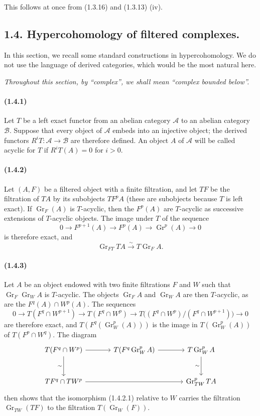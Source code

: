\documentclass[10pt]{article}
\newcommand{\Gr}{\operatorname{Gr}}
\newcommand{\calA}{\mathcal A}
\newcommand{\calB}{\mathcal B}
\newcommand{\iso}{\xrightarrow{\sim}}
\begin{document}
This follows at once from (1.3.16) and (1.3.13) (iv).

\subsection*{1.4. Hypercohomology of filtered complexes.}

In this section, we recall some standard constructions in hypercohomology. We do not use the language of derived categories, which would be the most natural here.

\emph{Throughout this section, by “complex”, we shall mean “complex bounded below”.}

\paragraph{(1.4.1)} Let $T$ be a left exact functor from an abelian category $\calA$ to an abelian category $\calB$. Suppose that every object of $\calA$ embeds into an injective object; the derived functors $R^iT:\calA\to\calB$ are therefore defined. An object $A$ of $\calA$ will be called acyclic for $T$ if $R^iT(A)=0$ for $i>0$.

\paragraph{(1.4.2)} Let $(A,F)$ be a filtered object with a finite filtration, and let $TF$ be the filtration of $TA$ by its subobjects $TF^pA$ (these are subobjects because $T$ is left exact). If $\Gr_F(A)$ is $T$-acyclic, then the $F^p(A)$ are $T$-acyclic as successive extensions of $T$-acyclic objects. The image under $T$ of the sequence
\[
0\to F^{p+1}(A)\to F^p(A)\to\Gr^p(A)\to0
\]
is therefore exact, and
\[
\tag{1.4.2.1}
\Gr_{FT}TA\iso T\Gr_FA.
\]

\paragraph{(1.4.3)} Let $A$ be an object endowed with two finite filtrations $F$ and $W$ such that $\Gr_F\Gr_WA$ is $T$-acyclic. The objects $\Gr_FA$ and $\Gr_WA$ are then $T$-acyclic, as are the $F^q(A)\cap W^p(A)$. The sequences
\[
0\to T(F^q\cap W^{p+1})\to T(F^q\cap W^p)\to T\bigl((F^q\cap W^p)/(F^q\cap W^{p+1})\bigr)\to0
\]
are therefore exact, and $T(F^q(\Gr_W^p(A)))$ is the image in $T(\Gr_W^p(A))$ of $T(F^p\cap W^q)$. The diagram
\[
\begin{tikzcd}[column sep=large,row sep=large]
T(F^q\cap W^p) \arrow[r] \arrow[d,"\sim"'] & T(F^q\Gr_W^pA) \arrow[r] & T\Gr_W^pA \arrow[d,"\sim"']\\
TF^q\cap TW^p \arrow[rr] && \Gr_{TW}^pTA
\end{tikzcd}
\]
then shows that the isomorphism (1.4.2.1) relative to $W$ carries the filtration $\Gr_{TW}(TF)$ to the filtration $T(\Gr_W(F))$.
\end{document}

